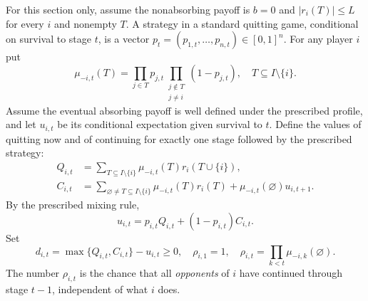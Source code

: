 \documentclass[11pt,a4paper]{article}
\theoremstyle{definition}
\theoremstyle{remark}
\begin{document}
For this section only, assume the nonabsorbing payoff is $b=0$ and $|r_i(T)|\le L$ for every $i$ and nonempty $T$. A strategy in a standard quitting game, conditional on survival to stage $t$, is a vector $p_t=(p_{1,t},\dots,p_{n,t})\in[0,1]^n$. For any player $i$ put
\[
\mu_{-i,t}(T)=\prod_{j\in T}p_{j,t}
\prod_{\substack{j\notin T\\j\ne i}}(1-p_{j,t}),\quad T\subseteq I\setminus\{i\}.
\]
Assume the eventual absorbing payoff is well defined under the prescribed profile, and let $u_{i,t}$ be its conditional expectation given survival to $t$. Define the values of quitting now and of continuing for exactly one stage followed by the prescribed strategy:
\begin{align}
Q_{i,t}&=\sum_{T\subseteq I\setminus\{i\}}\mu_{-i,t}(T)r_i(T\cup\{i\}),\label{eq:q-stage}\\
C_{i,t}&=\sum_{\varnothing\ne T\subseteq I\setminus\{i\}}\mu_{-i,t}(T)r_i(T)
+\mu_{-i,t}(\varnothing)u_{i,t+1}.\label{eq:c-stage}
\end{align}
By the prescribed mixing rule,
\[
u_{i,t}=p_{i,t}Q_{i,t}+(1-p_{i,t})C_{i,t}.
\]
Set
\begin{equation}\label{eq:defect}
d_{i,t}=\max\{Q_{i,t},C_{i,t}\}-u_{i,t}\ge0,\quad
\rho_{i,1}=1,\quad
\rho_{i,t}=\prod_{k<t}\mu_{-i,k}(\varnothing).
\end{equation}
The number $\rho_{i,t}$ is the chance that all \emph{opponents} of $i$ have continued through stage $t-1$, independent of what $i$ does.
\end{document}
